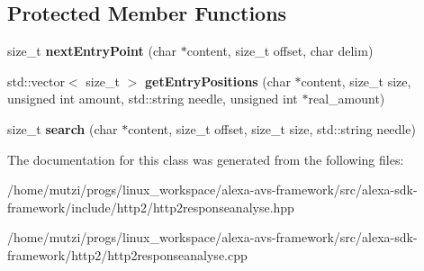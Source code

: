 \subsection*{Protected Member Functions}
\begin{DoxyCompactItemize}
\item 
\mbox{\label{classhttp2_1_1HTTP2ResponseAnalyse_aa7962adc1cb1599e22597fdef157af58}} 
size\+\_\+t {\bfseries next\+Entry\+Point} (char $\ast$content, size\+\_\+t offset, char delim)
\item 
\mbox{\label{classhttp2_1_1HTTP2ResponseAnalyse_ada0d1180c711199d7ff4612544dc280b}} 
std\+::vector$<$ size\+\_\+t $>$ {\bfseries get\+Entry\+Positions} (char $\ast$content, size\+\_\+t size, unsigned int amount, std\+::string needle, unsigned int $\ast$real\+\_\+amount)
\item 
\mbox{\label{classhttp2_1_1HTTP2ResponseAnalyse_adbd3b150da38e2a927f1f19c11b68360}} 
size\+\_\+t {\bfseries search} (char $\ast$content, size\+\_\+t offset, size\+\_\+t size, std\+::string needle)
\end{DoxyCompactItemize}


The documentation for this class was generated from the following files\+:\begin{DoxyCompactItemize}
\item 
/home/mutzi/progs/linux\+\_\+workspace/alexa-\/avs-\/framework/src/alexa-\/sdk-\/framework/include/http2/http2responseanalyse.\+hpp\item 
/home/mutzi/progs/linux\+\_\+workspace/alexa-\/avs-\/framework/src/alexa-\/sdk-\/framework/http2/http2responseanalyse.\+cpp\end{DoxyCompactItemize}
